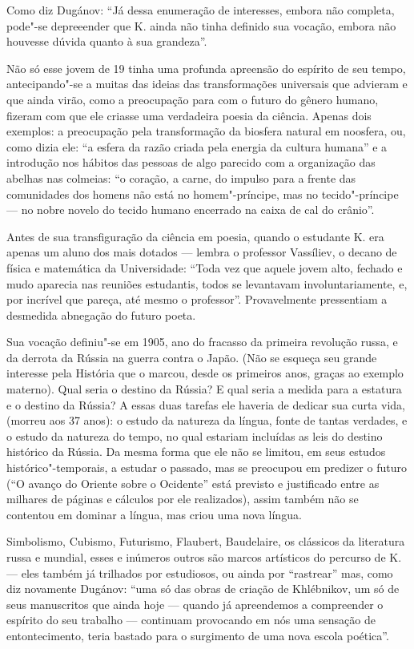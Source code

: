 {Como diz Dugánov: ``Já dessa enumeração de interesses, embora não
completa, pode"-se depreeender que K. ainda não tinha definido sua
vocação, embora não houvesse dúvida quanto à sua grandeza''.

Não só esse jovem de 19 tinha uma profunda apreensão do espírito de seu
tempo, antecipando"-se a muitas das ideias das transformações universais
que advieram e que ainda virão, como a preocupação para com o futuro do
gênero humano, fizeram com que ele criasse uma verdadeira poesia da
ciência. Apenas dois exemplos: a preocupação pela transformação da
biosfera natural em noosfera, ou, como dizia ele: ``a esfera da razão
criada pela energia da cultura humana'' e a introdução nos hábitos das
pessoas de algo parecido com a organização das abelhas nas colmeias: ``o coração, a carne, do impulso para a frente das comunidades dos homens
não está no homem"-príncipe, mas no tecido"-príncipe --- no nobre novelo do
tecido humano encerrado na caixa de cal do crânio''.

Antes de sua transfiguração da ciência em poesia, quando o estudante K.
era apenas um aluno dos mais dotados --- lembra o professor Vassíliev, o
decano de física e matemática da Universidade: ``Toda vez que aquele
jovem alto, fechado e mudo aparecia nas reuniões estudantis, todos se
levantavam involuntariamente, e, por incrível que pareça, até mesmo o
professor''. Provavelmente pressentiam a desmedida abnegação do futuro
poeta.

Sua vocação definiu"-se em 1905, ano do fracasso da primeira revolução
russa, e da derrota da Rússia na guerra contra o Japão. (Não se esqueça
seu grande interesse pela História que o marcou, desde os primeiros
anos, graças ao exemplo materno). Qual seria o destino da Rússia? E qual
seria a medida para a estatura e o destino da Rússia? A essas duas
tarefas ele haveria de dedicar sua curta vida, (morreu aos
37 anos): o estudo da natureza da língua, fonte de tantas verdades, e o
estudo da natureza do tempo, no qual estariam incluídas as leis do
destino histórico da Rússia. Da mesma forma que ele não se limitou, em
seus estudos histórico"-temporais, a estudar o passado, mas se preocupou
em predizer o futuro (``O avanço do Oriente sobre o Ocidente'' está
previsto e justificado entre as milhares de páginas e cálculos por ele
realizados), assim também não se contentou em dominar a língua, mas
criou uma nova língua.

Simbolismo, Cubismo, Futurismo, Flaubert, Baudelaire, os clássicos da
literatura russa e mundial, esses e inúmeros outros são marcos
artísticos do percurso de K. --- eles também já trilhados por estudiosos,
ou ainda por ``rastrear'' mas, como diz novamente Dugánov: ``uma só das
obras de criação de Khlébnikov, um só de seus manuscritos que ainda hoje
--- quando já apreendemos a compreender o espírito do seu trabalho ---
continuam provocando em nós uma sensação de entontecimento, teria
bastado para o surgimento de uma nova escola poética''.

}
